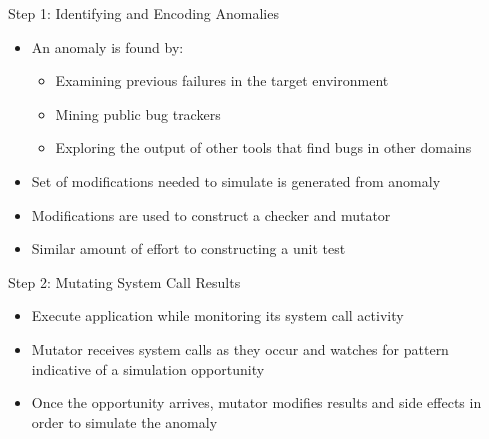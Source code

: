 \documentclass[pdf]{beamer}
\begin{document}
\begin{frame}{Step 1: Identifying and Encoding Anomalies}
  \begin{itemize}
    \item{An anomaly is found by:}
      \begin{itemize}
        \item{Examining previous failures in the target environment}
        \item{Mining public bug trackers}
        \item{Exploring the output of other tools that find bugs in other
          domains}
      \end{itemize}
    \item{Set of modifications needed to simulate is generated from anomaly}
    \item{Modifications are used to construct a checker and mutator}
    \item{Similar amount of effort to constructing a unit test}
  \end{itemize}
\end{frame}


\begin{frame}{Step 2: Mutating System Call Results}
  \begin{itemize}
    \item{Execute application while monitoring its system call activity}
    \item{Mutator receives system calls as they occur and watches for pattern
      indicative of a simulation opportunity}
    \item{Once the opportunity arrives, mutator modifies results and side effects
      in order to simulate the anomaly}
  \end{itemize}
\end{frame}
\end{document}
